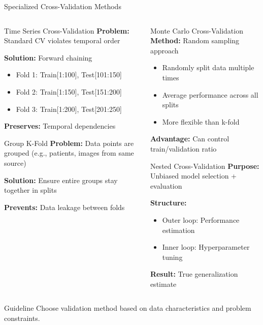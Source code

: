 \documentclass[8pt,aspectratio=1610]{beamer}
\begin{document}
\begin{frame}{Specialized Cross-Validation Methods}
\begin{columns}[t]
\begin{column}{0.48\textwidth}
\begin{block}{Time Series Cross-Validation}
\textbf{Problem:} Standard CV violates temporal order

\textbf{Solution:} Forward chaining
\begin{itemize}
\item Fold 1: Train[1:100], Test[101:150]
\item Fold 2: Train[1:150], Test[151:200]
\item Fold 3: Train[1:200], Test[201:250]
\end{itemize}

\textbf{Preserves:} Temporal dependencies
\end{block}

\begin{block}{Group K-Fold}
\textbf{Problem:} Data points are grouped (e.g., patients, images from same source)

\textbf{Solution:} Ensure entire groups stay together in splits

\textbf{Prevents:} Data leakage between folds
\end{block}
\end{column}

\begin{column}{0.48\textwidth}
\begin{block}{Monte Carlo Cross-Validation}
\textbf{Method:} Random sampling approach
\begin{itemize}
\item Randomly split data multiple times
\item Average performance across all splits
\item More flexible than k-fold
\end{itemize}

\textbf{Advantage:} Can control train/validation ratio
\end{block}

\begin{block}{Nested Cross-Validation}
\textbf{Purpose:} Unbiased model selection + evaluation

\textbf{Structure:}
\begin{itemize}
\item Outer loop: Performance estimation
\item Inner loop: Hyperparameter tuning
\end{itemize}

\textbf{Result:} True generalization estimate
\end{block}
\end{column}
\end{columns}

\begin{alertblock}{Guideline}
Choose validation method based on data characteristics and problem constraints.
\end{alertblock}
\end{frame}
\end{document}
